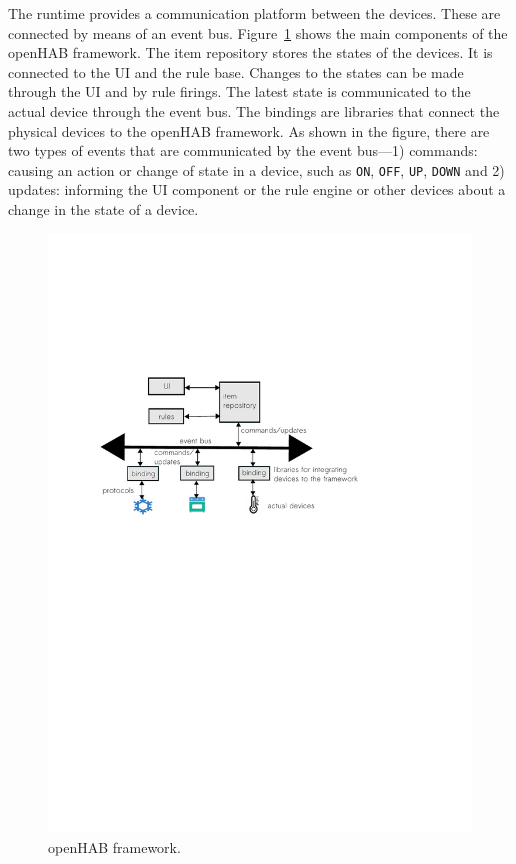 \documentclass{sig-alternate-05-2015}
\begin{document}
The runtime provides a communication platform between the devices. These are connected by means of an event bus. Figure~\ref{fig:framework} shows the main components of the openHAB framework. The item repository stores the states of the devices. It is connected to the UI and the rule base. Changes to the states can be made through the UI and by rule firings. The latest state is communicated to the actual device through the event bus. The bindings are libraries that connect the physical devices to the openHAB framework. As shown in the figure, there are two types of events that are communicated by the event bus---1) commands: causing an action or change of state in a device, such as \texttt{ON}, \texttt{OFF}, \texttt{UP}, \texttt{DOWN} and 2) updates: informing the UI component or the rule engine or other devices about a change in the state of a device.
\begin{figure}
\centering
\includegraphics [trim=-2cm 15cm 0 6.5cm, scale=0.4]{images/framework.pdf}
\caption{openHAB framework.}
\label{fig:framework}
\end{figure} 
\end{document}

